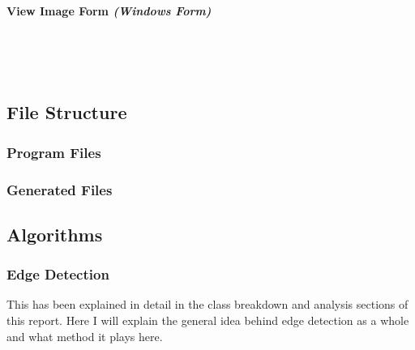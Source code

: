 \begin{FlushLeft}
    \bk

    \paragraph*{View Image Form \textit{(Windows Form)}} \mbox{} \\

    \begin{figure}[H]
        \centering
    \end{figure}\\

    \BK

    \subsection{File Structure}
    \subsubsection{Program Files}
    \bk
    \subsubsection{Generated Files}
    \bk

    \BK

    \subsection{Algorithms}

    \subsubsection{Edge Detection}
    This has been explained in detail in the class breakdown and analysis sections of this report. Here I will explain the general idea behind edge detection as a whole and what method it plays here. \\ \bk


\end{FlushLeft}
